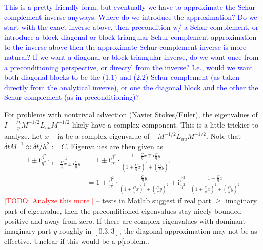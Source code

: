 \documentclass[a4paper,10pt]{article}
\makeatletter
\newcommand{\tcb}{\textcolor{blue}}
\newcommand{\todo}[1]{\textcolor{red}{[TODO\@: #1]}}
\makeatother
\begin{document}
%
\tcb{This is a pretty friendly form, but eventually we have to approximate
the Schur complement inverse anyways. Where do we introduce the approximation?
Do we start with the exact inverse above, then precondition w/ a Schur complement,
or introduce a block-diagonal or block-triangular Schur complement approximation
to the inverse above then the approximate Schur complement inverse is more natural?
If we want a diagonal or block-triangular inverse, do we want once from a
preconditioning perspective, or directyl from the inverse? I.e., would we want
both diagonal blocks to be the (1,1) and (2,2) Schur complement (as taken
directly from the analytical inverse), or one the diagonal block and the other
the Schur complement (as in preconditioning)?}




For problems with nontrivial advection (Navier Stokes/Euler), the eigenvalues
of $I - \tfrac{\delta t}{\eta} M^{-1/2}L_{uu}M^{-1/2}$ likely have a complex component.
This is a little trickier to analyze. Let $x + \mathrm{i}y$ be a complex eigenvalue
of $-M^{-1/2}L_{uu}M^{-1/2}$. Note that $\delta tM^{-1} \approx \delta t/h^2 := C$.
Eigenvalues are then given as
%
\begin{align*}
1 \pm \mathrm{i}\frac{\beta^2}{\eta^2} \cdot
	\frac{1}{1 + \frac{C}{\eta}x \pm \mathrm{i}\frac{C}{\eta}y}
& = 1 \pm \mathrm{i}\frac{\beta^2}{\eta^2} \cdot
	\frac{1 + \frac{C}{\eta}x \mp \mathrm{i}\frac{C}{\eta}y}{(1 + \frac{C}{\eta}x)^2 +
		(\frac{C}{\eta}y)^2} \\
& = 1 \pm \frac{\beta^2}{\eta^2} \cdot
		\frac{\frac{C}{\eta}y}{(1 + \frac{C}{\eta}x)^2 + (\frac{C}{\eta}y)^2}
	\pm \mathrm{i}\frac{\beta^2}{\eta^2} \cdot
	\frac{1 + \frac{C}{\eta}x}{(1 + \frac{C}{\eta}x)^2 +
		(\frac{C}{\eta}y)^2}
\end{align*}
%
\todo{Analyze this more } -- tests in Matlab suggest if real part $\geq$ imaginary
part of eigenvalue, then the preconditioned eigenvalues stay nicely bounded positive
and away from zero. If there are complex eigenvalues with dominant imaginary part $y$
roughly in $[0.3,3]$, the diagonal approximation may not be as effective. Unclear if
this would be a p[roblem..

%
\end{document}
